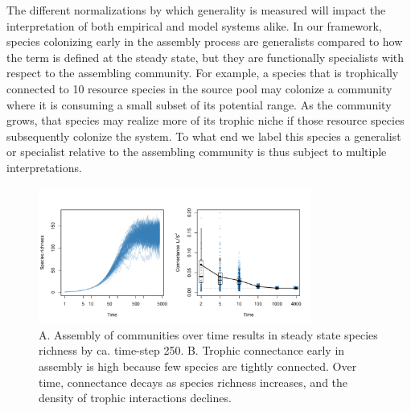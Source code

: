 \documentclass[9pt,twocolumn,twoside]{pnas-new}
\begin{document}
The different normalizations by which generality is measured will impact the interpretation of both empirical and model systems alike.
In our framework, species colonizing early in the assembly process are generalists compared to how the term is defined at the steady state, but they are functionally specialists with respect to the assembling community.
For example, a species that is trophically connected to 10 resource species in the source pool may colonize a community where it is consuming a small subset of its potential range.
As the community grows, that species may realize more of its trophic niche if those resource species subsequently colonize the system.
To what end we label this species a generalist or specialist relative to the assembling community is thus subject to multiple interpretations.



\begin{figure}[h!]
\centering
\includegraphics[width=0.8\textwidth]{fig_conn.pdf}
\caption{
A. Assembly of communities over time results in steady state species richness by ca. time-step 250.
B. Trophic connectance early in assembly is high because few species are tightly connected.
Over time, connectance decays as species richness increases, and the density of trophic interactions declines.
}
\label{fig:conn}
\end{figure}
\end{document}
